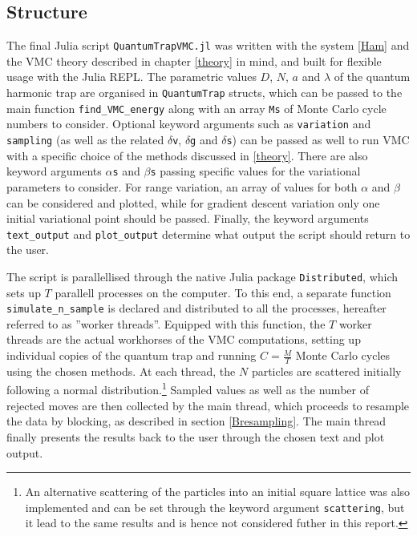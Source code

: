 \documentclass[a4paper,8pt]{article}
\begin{document}
\begin{multicols}{2}
\subsection{Structure}\label{structure}
The final Julia script \texttt{QuantumTrapVMC.jl} was written with the system \eqref{Ham} and the VMC theory described in chapter \ref{theory} in mind, and built for flexible usage with the Julia REPL.  The parametric values $D$, $N$, $a$ and $\lambda$ of the quantum harmonic trap are organised in \texttt{QuantumTrap} structs, which can be passed to the main function \texttt{find\_VMC\_energy} along with an array \texttt{Ms} of Monte Carlo cycle numbers to consider. Optional keyword arguments such as \texttt{variation} and \texttt{sampling} (as well as the related \texttt{$\delta$v}, \texttt{$\delta$g} and \texttt{$\delta$s}) can be passed as well to run VMC with a specific choice of the methods discussed in \ref{theory}. There are also keyword arguments \texttt{$\alpha$s} and \texttt{$\beta$s} passing specific values for the variational parameters to consider. For range variation, an array of values for both $\alpha$ and $\beta$ can be considered and plotted, while for gradient descent variation only one initial variational point should be passed. Finally, the keyword arguments \texttt{text\_output} and \texttt{plot\_output} determine what output the script should return to the user.

The script is parallellised through the native Julia package \texttt{Distributed}, which sets up $T$ parallell processes on the computer. To this end, a separate function \texttt{simulate\_n\_sample} is declared and distributed to all the processes, hereafter referred to as ''worker threads''. Equipped with this function, the $T$ worker threads are the actual workhorses of the VMC computations, setting up individual copies of the quantum trap and running $C = \frac{M}{T}$ Monte Carlo cycles using the chosen methods. At each thread, the $N$ particles are scattered initially following a normal distribution.\footnote{An alternative scattering of the particles into an initial square lattice was also implemented and can be set through the keyword argument \texttt{scattering}, but it lead to the same results and is hence not considered futher in this report.} Sampled values as well as the number of rejected moves are then collected by the main thread, which proceeds to resample the data by blocking, as described in section \ref{Bresampling}. The main thread finally presents the results back to the user through the chosen text and plot output.


\end{multicols}
\end{document}
